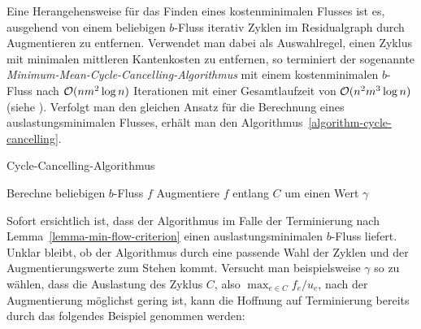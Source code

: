 Eine Herangehensweise für das Finden eines kostenminimalen Flusses ist es, ausgehend von einem beliebigen $b$-Fluss iterativ Zyklen im Residualgraph durch Augmentieren zu entfernen.
Verwendet man dabei als Auswahlregel, einen Zyklus mit minimalen mittleren Kantenkosten zu entfernen, so terminiert der sogenannte \emph{Minimum-Mean-Cycle-Cancelling-Algorithmus} mit einem kostenminimalen $b$-Fluss nach $\mathcal{O}(nm^2\log n)$ Iterationen mit einer Gesamtlaufzeit von $\mathcal{O}(n^2m^3 \log n)$ (siehe \cite[Theoreme~3.9, 3.10]{Goldberg1989}).
Verfolgt man den gleichen Ansatz für die Berechnung eines auslastungsminimalen Flusses, erhält man den Algorithmus~\ref{algorithm-cycle-cancelling}.
\begin{algorithm}
	\caption{Cycle-Cancelling-Algorithmus}
	\label{algorithm-cycle-cancelling}
	\begin{algorithmic}[1]
		\State Berechne beliebigen $b$-Fluss $f$
			\State Augmentiere $f$ entlang $C$ um einen Wert $\gamma$
		\EndWhile
		\EndProcedure
	\end{algorithmic}
\end{algorithm}

Sofort ersichtlich ist, dass der Algorithmus im Falle der Terminierung nach Lemma~\ref{lemma-min-flow-criterion} einen auslastungsminimalen $b$-Fluss liefert.
Unklar bleibt, ob der Algorithmus durch eine passende Wahl der Zyklen und der Augmentierungswerte zum Stehen kommt.
Versucht man beispielsweise $\gamma$ so zu wählen, dass die Auslastung des Zyklus $C$, also $\max_{e\in C} f_e / u_e$, nach der Augmentierung möglichst gering ist, kann die Hoffnung auf Terminierung bereits durch das folgendes Beispiel genommen werden:

